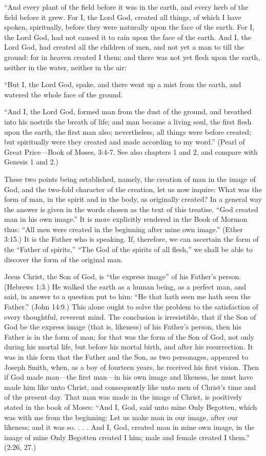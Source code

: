 ``And every plant of the field before it was in the earth, and every herb of the field before it
grew. For I, the Lord God, created all things, of which I have spoken, spiritually, before they
were naturally upon the face of the earth. For I, the Lord God, had not caused it to rain upon
the face of the earth. And I, the Lord God, had created all the children of men, and not yet a
man to till the ground: for in heaven created I them; and there was not yet flesh upon the
earth, neither in the water, neither in the air:

``But I, the Lord God, spake, and there went up a mist from the earth, and watered the whole
face of the ground.

``And I, the Lord God, formed man from the dust of the ground, and breathed into his nostrils
the breath of life; and man became a living soul, the first flesh upon the earth, the first man
also; nevertheless, all things were before created; but spiritually were they created and made
according to my word.'' (Pearl of Great Price—Book of Moses, 3:4-7. See also chapters 1
and 2, and compare with Genesis 1 and 2.)

These two points being established, namely, the creation of man in the image of God, and the
two-fold character of the creation, let us now inquire: What was the form of man, in the spirit
and in the body, as originally created? In a general way the answer is given in the words
chosen as the text of this treatise. ``God created man in his own image.'' It is more explicitly
rendered in the Book of Mormon thus: ``All men were created in the beginning after mine
own image.'' (Ether 3:15.) It is the Father who is speaking. If, therefore, we can ascertain the
form of the ``Father of spirits,'' ``The God of the spirits of all flesh,'' we shall be able to
discover the form of the original man.

Jesus Christ, the Son of God, is ``the express image'' of his Father's person. (Hebrews 1:3.) He
walked the earth as a human being, as a perfect man, and said, in answer to a question put to
him: ``He that hath seen me hath seen the Father.'' (John 14:9.) This alone ought to solve the
problem to the satisfaction of every thoughtful, reverent mind. The conclusion is irresistible,
that if the Son of God be the express image (that is, likeness) of his Father's person, then his
Father is in the form of man; for that was the form of the Son of God, not only during his
mortal life, but before his mortal birth, and after his resurrection. It was in this form that the
Father and the Son, as two personages, appeared to Joseph Smith, when, as a boy of fourteen
years, he received his first vision. Then if God made man—the first man—in his own image
and likeness, he must have made him like unto Christ, and consequently like unto men of
Christ's time and of the present day. That man was made in the image of Christ, is positively
stated in the book of Moses: ``And I, God, said unto mine Only Begotten, which was with me
from the beginning: Let us make man in our image, after our likeness; and it was so. . . . And
I, God, created man in mine own image, in the image of mine Only Begotten created I him;
male and female created I them.'' (2:26, 27.)

